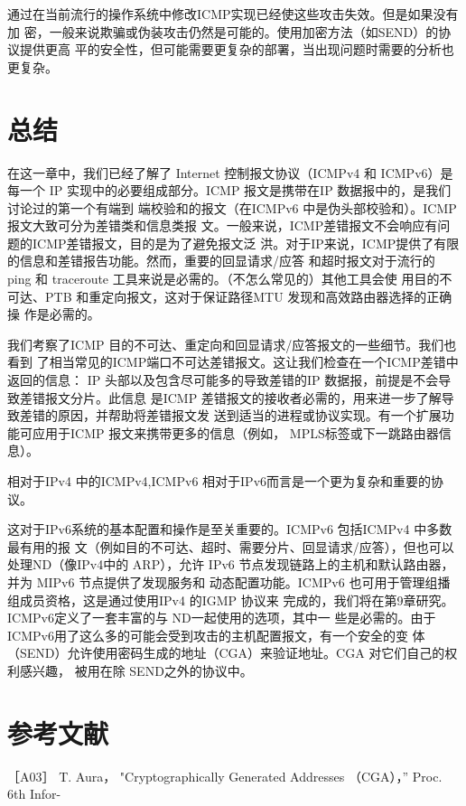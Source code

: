 通过在当前流行的操作系统中修改ICMP实现已经使这些攻击失效。但是如果没有加
密，一般来说欺骗或伪装攻击仍然是可能的。使用加密方法（如SEND）的协议提供更高
平的安全性，但可能需要更复杂的部署，当出现问题时需要的分析也更复杂。

\section{总结}

在这一章中，我们已经了解了 Internet 控制报文协议（ICMPv4 和 ICMPv6）是每一个 IP
实现中的必要组成部分。ICMP 报文是携带在IP 数据报中的，是我们讨论过的第一个有端到
端校验和的报文（在ICMPv6 中是伪头部校验和）。ICMP报文大致可分为差错类和信息类报
文。一般来说，ICMP差错报文不会响应有问题的ICMP差错报文，目的是为了避免报文泛
洪。对于IP来说，ICMP提供了有限的信息和差错报告功能。然而，重要的回显请求/应答
和超时报文对于流行的 ping 和 traceroute 工具来说是必需的。（不怎么常见的）其他工具会使
用目的不可达、PTB 和重定向报文，这对于保证路径MTU 发现和高效路由器选择的正确操
作是必需的。

我们考察了ICMP 目的不可达、重定向和回显请求/应答报文的一些细节。我们也看到
了相当常见的ICMP端口不可达差错报文。这让我们检查在一个ICMP差错中返回的信息：
IP 头部以及包含尽可能多的导致差错的IP 数据报，前提是不会导致差错报文分片。此信息
是ICMP 差错报文的接收者必需的，用来进一步了解导致差错的原因，并帮助将差错报文发
送到适当的进程或协议实现。有一个扩展功能可应用于ICMP 报文来携带更多的信息（例如，
MPLS标签或下一跳路由器信息）。

相对于IPv4 中的ICMPv4,ICMPv6 相对于IPv6而言是一个更为复杂和重要的协议。

这对于IPv6系统的基本配置和操作是至关重要的。ICMPv6 包括ICMPv4 中多数最有用的报
文（例如目的不可达、超时、需要分片、回显请求/应答），但也可以处理ND（像IPv4中的
ARP），允许 IPv6 节点发现链路上的主机和默认路由器，并为 MIPv6 节点提供了发现服务和
动态配置功能。ICMPv6 也可用于管理组播组成员资格，这是通过使用IPv4 的IGMP 协议来
完成的，我们将在第9章研究。ICMPv6定义了一套丰富的与 ND一起使用的选项，其中一
些是必需的。由于ICMPv6用了这么多的可能会受到攻击的主机配置报文，有一个安全的变
体（SEND）允许使用密码生成的地址（CGA）来验证地址。CGA 对它们自己的权利感兴趣，
被用在除 SEND之外的协议中。

\section{参考文献}
［A03］ T. Aura， "Cryptographically Generated Addresses （CGA），” Proc. 6th Infor-

